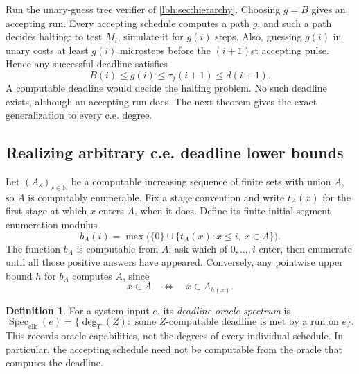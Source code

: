 \documentclass[11pt,letterpaper]{article}
\theoremstyle{definition}
\newtheorem{definition}[theorem]{Definition}
\theoremstyle{remark}
\newcommand{\N}{\mathbb N}
\newcommand{\1}{\mathbf 1}
\begin{document}
Run the unary-guess tree verifier of \cref{lbh:sec:hierarchy}. Choosing $g=B$
gives an accepting run. Every accepting schedule computes a path $g$, and
such a path decides halting: to test $M_i$, simulate it for $g(i)$ steps.
Also, guessing $g(i)$ in unary costs at least $g(i)$ microsteps before the
$(i+1)$st accepting pulse. Hence any successful deadline satisfies
\[
 B(i)\le g(i)\le\tau_f(i+1)\le d(i+1).
\]
A computable deadline would decide the halting problem. No such deadline
exists, although an accepting run does. The next theorem gives the exact
generalization to every c.e. degree.

\subsection{Realizing arbitrary c.e. deadline lower bounds}
Let $(A_s)_{s\in\N}$ be a computable increasing sequence of finite sets
with union $A$, so $A$ is computably enumerable. Fix a stage convention and
write $t_A(x)$ for the first stage at which $x$ enters $A$, when it does.
Define its finite-initial-segment enumeration modulus
\begin{equation}\label{lbh:eq:enum-modulus}
 b_A(i)=\max\bigl(\{0\}\cup\{t_A(x):x\le i,\ x\in A\}\bigr).
\end{equation}
The function $b_A$ is computable from $A$: ask which of $0,\ldots,i$ enter,
then enumerate until all those positive answers have appeared. Conversely,
any pointwise upper bound $h$ for $b_A$ computes $A$, since
\begin{equation}\label{lbh:eq:decide-c.e.}
 x\in A\quad\Longleftrightarrow\quad x\in A_{h(x)}.
\end{equation}

\begin{definition}
For a system input $e$, its \emph{deadline oracle spectrum} is
\[
 \operatorname{Spec}_{\mathrm{clk}}(e)=
 \{\deg_T(Z):\text{ some $Z$-computable deadline is met by a run on }e\}.
\]
This records oracle capabilities, not the degrees of every individual
schedule. In particular, the accepting schedule need not be computable
from the oracle that computes the deadline.
\end{definition}
\end{document}
